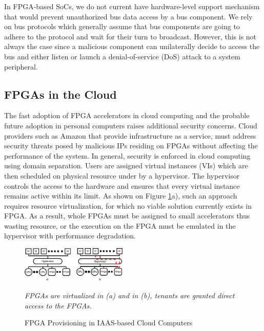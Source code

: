 \documentclass[sigconf]{acmart}
\theoremstyle{plain}
\theoremstyle{remark}
\begin{document}
In FPGA-based SoCs, we do not current have hardware-level support mechanism that would prevent unauthorized bus data access by a bus component. We rely on bus protocols which generally assume that bus components are going to adhere to the protocol and wait for their turn to broadcast. However, this is not always the case since a malicious component can unilaterally decide to access the bus and either listen or launch a denial-of-service (DoS) attack to a system peripheral.



\subsection{FPGAs in the Cloud}

The fast adoption of FPGA accelerators in cloud computing and the probable future adoption in personal computers raises additional security concerns. Cloud providers such as Amazon that provide infrastructure as a service, must address security threats posed by malicious IPs residing on FPGAs without affecting the performance of the system. In general, security is enforced in cloud computing using domain separation. Users are assigned virtual instances (VIs) which are then scheduled on physical resource under by a hypervisor. The hypervisor controls the access to the hardware and ensures that every virtual instance remains active within its limit. As shown on Figure \ref{fig:iaas-fpga}a), such an approach requires resource virtualization, for which no viable solution currently exists in FPGA. As a result, whole FPGAs must be assigned to small accelerators thus wasting resource, or the execution on the FPGA must be emulated in the hypervisor with performance degradation.

\begin{figure}[h]
\centering
\includegraphics[width=0.45\textwidth]{figures/CloudThreatModel.pdf}
\caption{FPGA Provisioning in IAAS-based Cloud Computers}
\textit{FPGAs are virtualized in (a) and in (b), tenants are granted direct access to the FPGAs.}
\label{fig:iaas-fpga}
\end{figure}
\end{document}
